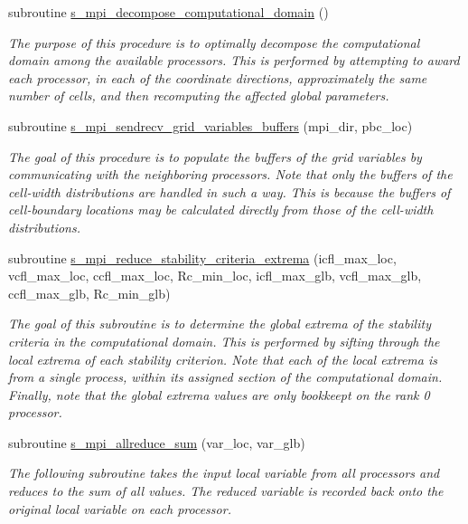 \begin{DoxyCompactItemize}
subroutine \hyperlink{namespacem__mpi__proxy_a80c5e235786545276fe6ffa06965017f}{s\+\_\+mpi\+\_\+decompose\+\_\+computational\+\_\+domain} ()
\begin{DoxyCompactList}\small\item\em The purpose of this procedure is to optimally decompose the computational domain among the available processors. This is performed by attempting to award each processor, in each of the coordinate directions, approximately the same number of cells, and then recomputing the affected global parameters. \end{DoxyCompactList}\item 
subroutine \hyperlink{namespacem__mpi__proxy_ac348cb6f02f2a9ab70d5c7eac6320231}{s\+\_\+mpi\+\_\+sendrecv\+\_\+grid\+\_\+variables\+\_\+buffers} (mpi\+\_\+dir, pbc\+\_\+loc)
\begin{DoxyCompactList}\small\item\em The goal of this procedure is to populate the buffers of the grid variables by communicating with the neighboring processors. Note that only the buffers of the cell-\/width distributions are handled in such a way. This is because the buffers of cell-\/boundary locations may be calculated directly from those of the cell-\/width distributions. \end{DoxyCompactList}\item 
subroutine \hyperlink{namespacem__mpi__proxy_a340a2c9b1688582ee485dd5d9bbcc864}{s\+\_\+mpi\+\_\+reduce\+\_\+stability\+\_\+criteria\+\_\+extrema} (icfl\+\_\+max\+\_\+loc, vcfl\+\_\+max\+\_\+loc, ccfl\+\_\+max\+\_\+loc, Rc\+\_\+min\+\_\+loc, icfl\+\_\+max\+\_\+glb, vcfl\+\_\+max\+\_\+glb, ccfl\+\_\+max\+\_\+glb, Rc\+\_\+min\+\_\+glb)
\begin{DoxyCompactList}\small\item\em The goal of this subroutine is to determine the global extrema of the stability criteria in the computational domain. This is performed by sifting through the local extrema of each stability criterion. Note that each of the local extrema is from a single process, within its assigned section of the computational domain. Finally, note that the global extrema values are only bookkeept on the rank 0 processor. \end{DoxyCompactList}\item 
subroutine \hyperlink{namespacem__mpi__proxy_a873520062481f3dabcfa77f9bd7728d3}{s\+\_\+mpi\+\_\+allreduce\+\_\+sum} (var\+\_\+loc, var\+\_\+glb)
\begin{DoxyCompactList}\small\item\em The following subroutine takes the input local variable from all processors and reduces to the sum of all values. The reduced variable is recorded back onto the original local variable on each processor. \end{DoxyCompactList}\item 

\end{DoxyCompactItemize}
